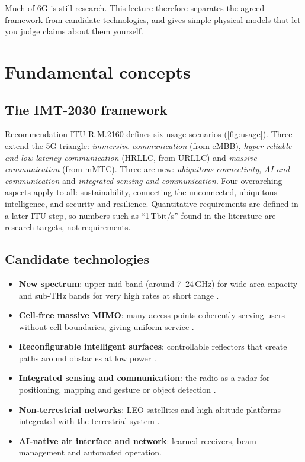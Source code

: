 \documentclass[11pt,a4paper]{article}
\begin{document}
Much of 6G is still research. This lecture therefore separates the agreed framework from candidate technologies, and gives simple physical
models that let you judge claims about them yourself.

\section{Fundamental concepts}

\subsection{The IMT-2030 framework}
Recommendation ITU-R M.2160 \cite{itu2023m2160} defines six usage scenarios (\cref{fig:usage}). Three extend the 5G triangle: \emph{immersive
communication} (from eMBB), \emph{hyper-reliable and low-latency communication} (HRLLC, from URLLC) and \emph{massive communication} (from mMTC).
Three are new: \emph{ubiquitous connectivity}, \emph{AI and communication} and \emph{integrated sensing and communication}. Four overarching
aspects apply to all: sustainability, connecting the unconnected, ubiquitous intelligence, and security and resilience. Quantitative
requirements are defined in a later ITU step, so numbers such as ``1\,Tbit/s'' found in the literature are research targets, not
requirements.

\begin{acnfigure}
  \caption{IMT-2030 usage scenarios and overarching aspects (after ITU-R M.2160).}
  \label{fig:usage}
\end{acnfigure}

\subsection{Candidate technologies}
\begin{itemize}
  \item \textbf{New spectrum}: upper mid-band (around 7--24\,GHz) for wide-area capacity and sub-THz bands for very high rates at short range
        \cite{rappaport2019above100}.
  \item \textbf{Cell-free massive MIMO}: many access points coherently serving users without cell boundaries, giving uniform service
        \cite{ngo2017cellfree}.
  \item \textbf{Reconfigurable intelligent surfaces}: controllable reflectors that create paths around obstacles at low power \cite{wu2019irs}.
  \item \textbf{Integrated sensing and communication}: the radio as a radar for positioning, mapping and gesture or object detection
        \cite{liu2022isac}.
  \item \textbf{Non-terrestrial networks}: LEO satellites and high-altitude platforms integrated with the terrestrial system \cite{tr38811}.
  \item \textbf{AI-native air interface and network}: learned receivers, beam management and automated operation.
\end{itemize}
\end{document}
